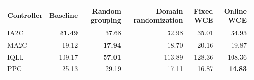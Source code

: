\begin{tabular}{lrrrrr}
\hline
Controller & Baseline & Random grouping & Domain randomization & Fixed WCE & Online WCE \\
\hline
IA2C & \textbf{31.49} & 37.68 & 32.98 & 35.01 & 34.93 \\
MA2C & 19.12 & \textbf{17.94} & 18.70 & 20.16 & 19.87 \\
IQLL & 109.17 & \textbf{57.01} & 113.89 & 128.36 & 108.36 \\
PPO & 25.13 & 29.19 & 17.11 & 16.87 & \textbf{14.83} \\
\hline
\end{tabular}
